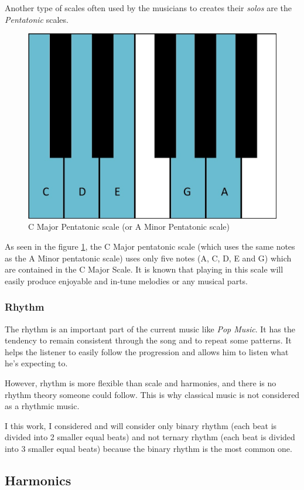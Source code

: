 \documentclass[12pt]{report}
\begin{document}
Another type of scales often used by the musicians to creates their \textit{solos} are the \textit{Pentatonic} scales.


\begin{figure}[H]
    \centering
    \includegraphics[width=0.5 \textwidth]{images/music/piano/pentatonic_scale.jpg}
    \caption{C Major Pentatonic scale (or A Minor Pentatonic scale)}
    \label{fig:pentatonic_scale_piano}
\end{figure}

As seen in the figure \ref{fig:pentatonic_scale_piano}, the C Major pentatonic scale (which uses the same notes as the A Minor pentatonic scale) uses only five notes (A, C, D, E and G) which are contained in the C Major Scale. It is known that playing in this scale will easily produce enjoyable and in-tune melodies or any musical parts. 


\subsubsection{Rhythm}

The rhythm is an important part of the current music like \textit{Pop Music}. It has the tendency to remain consistent through the song and to repeat some patterns.
It helps the listener to easily follow the progression and allows him to listen what he's expecting to.

However, rhythm is more flexible than scale and harmonies, and there is no rhythm theory someone could follow.
This is why classical music is not considered as a rhythmic music.

I this work, I considered and will consider only binary rhythm (each beat is divided into 2 smaller equal beats) and not ternary rhythm (each beat is divided into 3 smaller equal beats) because the binary rhythm is the most common one.


\subsection{Harmonics}
\label{sec:harmonics}
\end{document}
